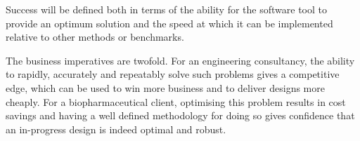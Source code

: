 Success will be defined both in terms of the ability for the software tool to
provide an optimum solution and the speed at which it can be implemented
relative to other methods or benchmarks.

The business imperatives are twofold.
For an engineering consultancy, the ability to rapidly, accurately and
repeatably solve such problems gives a competitive edge, which can be used to
win more business and to deliver designs more cheaply.  For a biopharmaceutical
client, optimising this problem results in cost savings and having a well
defined methodology for doing so gives confidence that an in-progress design is
indeed optimal and robust.

